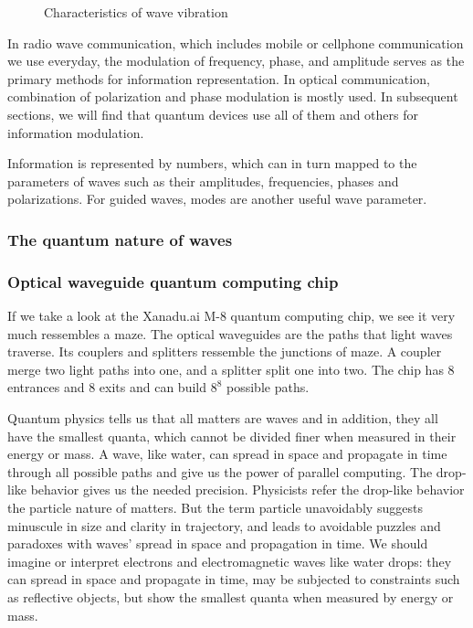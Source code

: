 \documentclass{book}
\begin{document}
\begin{figure}[ht]
\caption{Characteristics of wave vibration}
\label{wave}
\end{figure}

In radio wave communication, which includes mobile or cellphone communication we use everyday, the modulation of frequency, phase, and amplitude serves as the primary methods for information representation. In optical communication, combination of polarization and phase modulation is mostly used. In subsequent sections, we will find that quantum devices use all of them and others for information modulation.

Information is represented by numbers, which can in turn mapped to the parameters of waves such as their amplitudes, frequencies, phases and polarizations. For guided waves, modes are another useful wave parameter.

\subsubsection{The quantum nature of waves}

\subsubsection{Optical waveguide quantum computing chip}
If we take a look at the Xanadu.ai M-8 quantum computing chip, we see it very much ressembles a maze. The optical waveguides are the paths that light waves traverse. Its couplers and splitters ressemble the junctions of maze. A coupler merge two light paths into one, and a splitter split one into two. The chip has 8 entrances and 8 exits and can build $8^8$ possible paths.

Quantum physics tells us that all matters are waves and in addition, they all have the smallest quanta, which cannot be divided finer when measured in their energy or mass. A wave, like water, can spread in space and propagate in time through all possible paths and give us the power of parallel computing. The drop-like behavior gives us the needed precision. Physicists refer the drop-like behavior the particle nature of matters. But the term particle unavoidably suggests minuscule in size and clarity in trajectory, and leads to avoidable puzzles and paradoxes with waves' spread in space and propagation in time. We should imagine or interpret electrons and electromagnetic waves like water drops: they can spread in space and propagate in time, may be subjected to constraints such as reflective objects, but show the smallest quanta when measured by energy or mass.
\end{document}
